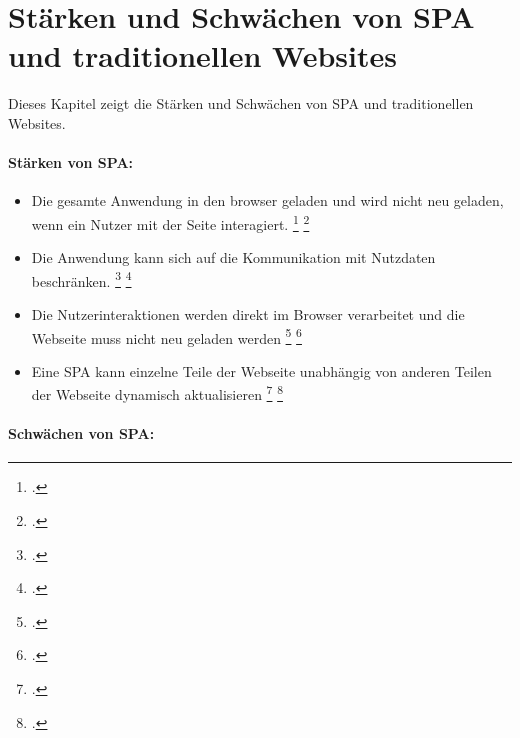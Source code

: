 \section{Stärken und Schwächen von \ac{SPA} und traditionellen Websites}
Dieses Kapitel zeigt die Stärken und Schwächen von \ac{SPA} und traditionellen Websites.



\paragraph*{Stärken von \ac{SPA}:}
\begin{itemize}
    \item Die gesamte Anwendung in den \gls{browser} geladen und wird nicht neu geladen, wenn ein Nutzer mit der Seite interagiert. \footcite[Vgl. ][Seite 3]{Smith2022} \footcite[Vgl.][Seite 7]{Flanagan2011}
    \item Die Anwendung kann sich auf die Kommunikation mit Nutzdaten beschränken. \footcite[Vgl. ][Seite 3]{Smith2022} \footcite[Vgl.][Seite 13]{Flanagan2011}
    \item Die Nutzerinteraktionen werden direkt im Browser verarbeitet und die Webseite muss nicht neu geladen werden \footcite[Vgl. ][Seite 3]{Smith2022} \footcite[Vgl.][Seite 12]{Flanagan2011}
    \item Eine \ac{SPA} kann einzelne Teile der Webseite unabhängig von anderen Teilen der Webseite dynamisch aktualisieren \footcite[Vgl. ][Seite 3]{Smith2022} \footcite[Vgl.][Seite 9]{Flanagan2011}
\end{itemize}


\paragraph*{Schwächen von \ac{SPA}:}


